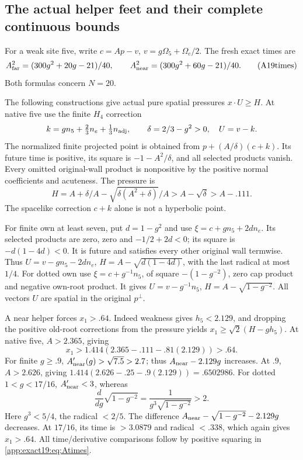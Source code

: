 \documentclass[11pt]{article}
\theoremstyle{definition}
\theoremstyle{remark}
\begin{document}
\subsection{The actual helper feet and their complete continuous bounds}
\label{app:exact19:Ahelperfeet}

For a weak site five, write
\(c=Ap-v\), \(v=g\Omega_5+\Omega_e/2\).
The fresh exact times are
\[
 A_{\rm far}^2=(300g^2+20g-21)/40,\qquad
 A_{\rm near}^2=(300g^2+60g-21)/40 .
\tag{A19times}\label{app:exact19:eq:Atimes}
\]
Both formulas concern \(N=20\).

The following constructions give actual
pure spatial pressures \(x\cdot U\ge H\).
At native five use the finite \(H_4\)
correction
\[
 k=g n_5+\tfrac23n_e+\tfrac13n_{\rm adj},\qquad
 \delta=2/3-g^2>0,\quad U=v-k .
\]
The normalized finite projected point
is obtained from \(p+(A/\delta)(c+k)\).
Its future time is positive, its square
is \(-1-A^2/\delta\), and all selected
products vanish.
Every omitted original-wall product
is nonpositive by the positive
normal coefficients and acuteness.
The pressure is
\[
 H=A+\delta/A-\sqrt{\delta(A^2+\delta)}/A
                   >A-\sqrt\delta>A-.111 .
\]
The spacelike correction \(c+k\)
alone is not a hyperbolic point.

For finite own at least seven,
put \(d=1-g^2\) and use
\(\xi=c+g n_5+2d n_e\).
Its selected products are zero,
zero and \(-1/2+2d<0\);
its square is \(-d(1-4d)<0\).
It is future and satisfies every
other original wall termwise.
Thus \(U=v-g n_5-2d n_e\),
\(H=A-\sqrt{d(1-4d)}\), with the
last radical at most \(1/4\).
For dotted own use
\(\xi=c+g^{-1}n_5\), of square
\(-(1-g^{-2})\), zero cap product
and negative own-root product.
It gives \(U=v-g^{-1}n_5\),
\(H=A-\sqrt{1-g^{-2}}\).
All vectors \(U\) are spatial in
the original \(p^\perp\).

A near helper forces \(x_1>.64\).
Indeed weakness gives \(h_5<2.129\),
and dropping the positive old-root
corrections from the pressure yields
\(x_1\ge\sqrt2(H-gh_5)\).
At native five, \(A>2.365\), giving
\[
              x_1>1.414(2.365-.111-.81(2.129))>.64 .
\]
For finite \(g\ge.9\),
\(A_{\rm near}'(g)>\sqrt{7.5}>2.7\);
thus \(A_{\rm near}-2.129g\) increases.
At \(.9\), \(A>2.626\), giving
\(1.414(2.626-.25-.9(2.129))=.6502986\).
For dotted \(1<g<17/16\),
\(A_{\rm near}'<3\), whereas
\[
                  \frac{d}{dg}\sqrt{1-g^{-2}}
                  =\frac1{g^3\sqrt{1-g^{-2}}}>2 .
\]
Here \(g^3<5/4\), the radical \(<2/5\).
The difference \(A_{\rm near}-\sqrt{1-g^{-2}}-2.129g\)
decreases.
At \(17/16\), its time is \(>3.0879\)
and radical \(<.338\), which again
gives \(x_1>.64\).
All time/derivative comparisons
follow by positive squaring in
\eqref{app:exact19:eq:Atimes}.
\end{document}

